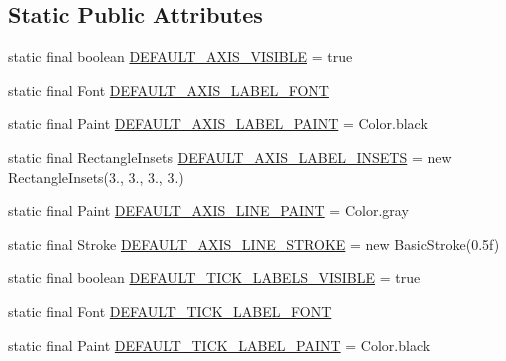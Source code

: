 \subsection*{Static Public Attributes}
\begin{DoxyCompactItemize}
\item 
static final boolean \mbox{\hyperlink{classorg_1_1jfree_1_1chart_1_1axis_1_1_axis_a864f3844ec4f72e9447d3f0e82939143}{D\+E\+F\+A\+U\+L\+T\+\_\+\+A\+X\+I\+S\+\_\+\+V\+I\+S\+I\+B\+LE}} = true
\item 
static final Font \mbox{\hyperlink{classorg_1_1jfree_1_1chart_1_1axis_1_1_axis_a3529ec9431166e1d6f19d1b8d482bb82}{D\+E\+F\+A\+U\+L\+T\+\_\+\+A\+X\+I\+S\+\_\+\+L\+A\+B\+E\+L\+\_\+\+F\+O\+NT}}
\item 
static final Paint \mbox{\hyperlink{classorg_1_1jfree_1_1chart_1_1axis_1_1_axis_a44c9e87ee8480b97ab9735db281962f3}{D\+E\+F\+A\+U\+L\+T\+\_\+\+A\+X\+I\+S\+\_\+\+L\+A\+B\+E\+L\+\_\+\+P\+A\+I\+NT}} = Color.\+black
\item 
static final Rectangle\+Insets \mbox{\hyperlink{classorg_1_1jfree_1_1chart_1_1axis_1_1_axis_ad77c628c0ce258e3589dbd5a20f07deb}{D\+E\+F\+A\+U\+L\+T\+\_\+\+A\+X\+I\+S\+\_\+\+L\+A\+B\+E\+L\+\_\+\+I\+N\+S\+E\+TS}} = new Rectangle\+Insets(3., 3., 3., 3.)
\item 
static final Paint \mbox{\hyperlink{classorg_1_1jfree_1_1chart_1_1axis_1_1_axis_add241b141f2e837e3200402248006be7}{D\+E\+F\+A\+U\+L\+T\+\_\+\+A\+X\+I\+S\+\_\+\+L\+I\+N\+E\+\_\+\+P\+A\+I\+NT}} = Color.\+gray
\item 
static final Stroke \mbox{\hyperlink{classorg_1_1jfree_1_1chart_1_1axis_1_1_axis_a030ae28f3d96f93faa7ed497a6adbf89}{D\+E\+F\+A\+U\+L\+T\+\_\+\+A\+X\+I\+S\+\_\+\+L\+I\+N\+E\+\_\+\+S\+T\+R\+O\+KE}} = new Basic\+Stroke(0.\+5f)
\item 
static final boolean \mbox{\hyperlink{classorg_1_1jfree_1_1chart_1_1axis_1_1_axis_af0f8700aef9c7128b1d1baab62307a2c}{D\+E\+F\+A\+U\+L\+T\+\_\+\+T\+I\+C\+K\+\_\+\+L\+A\+B\+E\+L\+S\+\_\+\+V\+I\+S\+I\+B\+LE}} = true
\item 
static final Font \mbox{\hyperlink{classorg_1_1jfree_1_1chart_1_1axis_1_1_axis_a3e4469850c9cd33f0f642df4224d777b}{D\+E\+F\+A\+U\+L\+T\+\_\+\+T\+I\+C\+K\+\_\+\+L\+A\+B\+E\+L\+\_\+\+F\+O\+NT}}
\item 
static final Paint \mbox{\hyperlink{classorg_1_1jfree_1_1chart_1_1axis_1_1_axis_a49d57d502e0ff6d5917f5b5de0d261b4}{D\+E\+F\+A\+U\+L\+T\+\_\+\+T\+I\+C\+K\+\_\+\+L\+A\+B\+E\+L\+\_\+\+P\+A\+I\+NT}} = Color.\+black
\item 

\end{DoxyCompactItemize}
